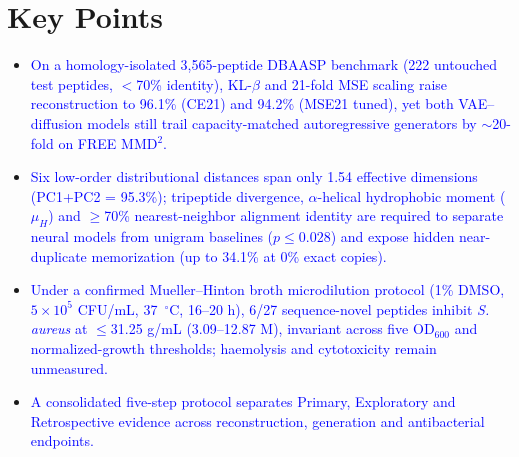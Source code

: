 \documentclass[unnumsec,webpdf,contemporary,large]{oup-authoring-template}
\newcommand{\rev}[1]{\textcolor{blue}{#1}}
\begin{document}
\noindent\begin{minipage}{\columnwidth}
\section*{Key Points}
\begin{itemize}
\item \rev{On a homology-isolated 3,565-peptide DBAASP benchmark (222 untouched test peptides, $<$70\% identity), KL-$\beta$ and 21-fold MSE scaling raise reconstruction to 96.1\% (CE21) and 94.2\% (MSE21 tuned), yet both VAE--diffusion models still trail capacity-matched autoregressive generators by $\sim$20-fold on FREE MMD$^2$.}
\item \rev{Six low-order distributional distances span only 1.54 effective dimensions (PC1+PC2 = 95.3\%); tripeptide divergence, $\alpha$-helical hydrophobic moment ($\mu_H$) and $\geq$70\% nearest-neighbor alignment identity are required to separate neural models from unigram baselines ($p\leq 0.028$) and expose hidden near-duplicate memorization (up to 34.1\% at 0\% exact copies).}
\item \rev{Under a confirmed Mueller--Hinton broth microdilution protocol (1\% DMSO, $5\times 10^5$ CFU/mL, 37~$^\circ$C, 16--20 h), 6/27 sequence-novel peptides inhibit \textit{S. aureus} at $\leq$31.25 \textmu{}g/mL (3.09--12.87 \textmu{}M), invariant across five OD$_{600}$ and normalized-growth thresholds; haemolysis and cytotoxicity remain unmeasured.}
\item \rev{A consolidated five-step protocol separates Primary, Exploratory and Retrospective evidence across reconstruction, generation and antibacterial endpoints.}
\end{itemize}
\end{minipage}
\end{document}
